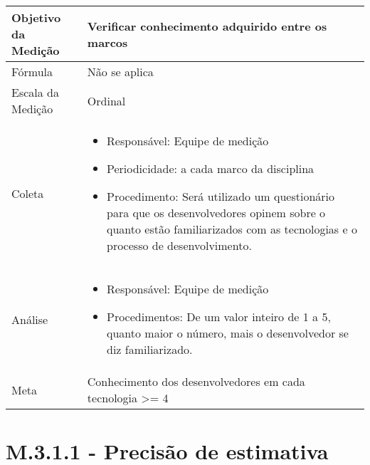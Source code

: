 	\begin{tabular}{ |p{4cm}|p{8cm}|  }
	 \hline
	 Objetivo da Medição 		& Verificar conhecimento adquirido entre os marcos	   \\
	 \hline
	 Fórmula		& 	Não se aplica	\\
	 \hline
	 Escala da Medição 		& 	Ordinal	 \\
	 \hline
	 Coleta		& 	\begin{itemize} \item Responsável: Equipe de medição \item Periodicidade: a cada marco da disciplina \item Procedimento: Será utilizado um questionário para que os desenvolvedores opinem sobre o quanto estão familiarizados com as tecnologias e o processo de desenvolvimento. \end{itemize}		\\
	 \hline
	 Análise		& 	\begin{itemize} \item Responsável: Equipe de medição \item Procedimentos: De um valor inteiro de 1 a 5, quanto maior o número, mais o desenvolvedor se diz familiarizado. \end{itemize}	 \\
	 \hline
	 Meta		& 	Conhecimento dos desenvolvedores em cada tecnologia >= 4	 \\
	 \hline
	\end{tabular}



\section{M.3.1.1 - Precisão de estimativa} %

